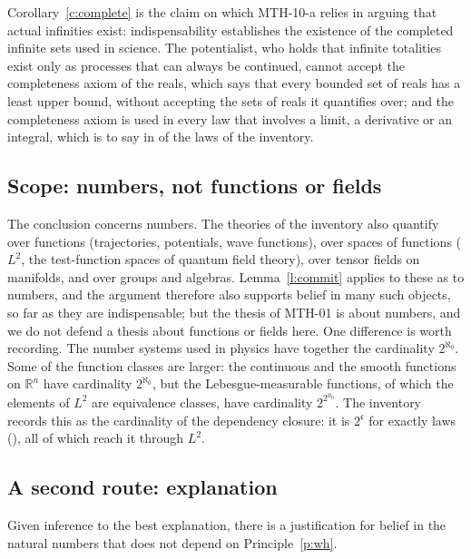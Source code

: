 \documentclass{situationist-preprint}
\begin{document}
Corollary~\ref{c:complete} is the claim on which MTH-10-a relies in arguing that actual infinities exist: indispensability establishes the existence of the completed infinite sets used in science. The potentialist, who holds that infinite totalities exist only as processes that can always be continued, cannot accept the completeness axiom of the reals, which says that every bounded set of reals has a least upper bound, without accepting the sets of reals it quantifies over; and the completeness axiom is used in every law that involves a limit, a derivative or an integral, which is to say in \nDomC{} of the \nLaws{} laws of the inventory.

\subsection{Scope: numbers, not functions or fields}

\begin{remark}[Scope]\label{r:scope}
The conclusion concerns numbers. The theories of the inventory also quantify over functions (trajectories, potentials, wave functions), over spaces of functions ($L^2$, the test-function spaces of quantum field theory), over tensor fields on manifolds, and over groups and algebras. Lemma~\ref{l:commit} applies to these as to numbers, and the argument therefore also supports belief in many such objects, so far as they are indispensable; but the thesis of MTH-01 is about numbers, and we do not defend a thesis about functions or fields here. One difference is worth recording. The number systems used in physics have together the cardinality $2^{\aleph_0}$. Some of the function classes are larger: the continuous and the smooth functions on $\mathbb R^n$ have cardinality $2^{\aleph_0}$, but the Lebesgue-measurable functions, of which the elements of $L^2$ are equivalence classes, have cardinality $2^{2^{\aleph_0}}$. The inventory records this as the cardinality of the dependency closure: it is $2^{\mathfrak c}$ for exactly \nClosTwoC{} laws (\listTwoC), all of which reach it through $L^2$.
\end{remark}

\subsection{A second route: explanation}

\begin{proposition}\label{p:expl}
Given inference to the best explanation, there is a justification for belief in the natural numbers that does not depend on Principle~\ref{p:wh}.
\end{proposition}
\end{document}
